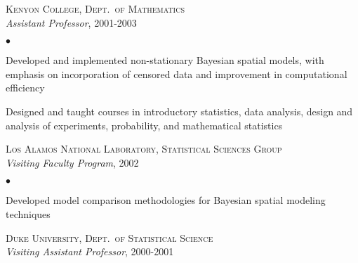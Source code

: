 \documentclass[11pt]{article}
\def\newempl{\vspace*{0.5cm}}
\begin{document}
\newpage
{}



\textsc{Kenyon College, Dept.\ of Mathematics}\\ %
\textit{Assistant Professor}, 2001-2003

\begin{list}{$\bullet$}{
\setlength{\topsep}{0cm}
\setlength{\partopsep}{0cm}
\setlength{\parsep}{0cm}
\setlength{\itemsep}{0cm}
\setlength{\labelsep}{1ex}
\setlength{\labelwidth}{1em}
\setlength{\leftmargin}{1em}
}
\item Developed and implemented non-stationary Bayesian spatial models, with emphasis on incorporation of censored data and improvement in computational efficiency
\item Designed and taught courses in introductory statistics, data analysis,
design and analysis of experiments, probability, and mathematical
statistics
\end{list}



\newempl
\textsc{Los Alamos National Laboratory, Statistical Sciences Group}\\ %
\textit{Visiting Faculty Program}, 2002

\begin{list}{$\bullet$}{
\setlength{\topsep}{0cm}
\setlength{\partopsep}{0cm}
\setlength{\parsep}{0cm}
\setlength{\itemsep}{0cm}
\setlength{\labelsep}{1ex}
\setlength{\labelwidth}{1em}
\setlength{\leftmargin}{1em}
}
\item Developed model comparison methodologies for Bayesian spatial
  modeling techniques
\end{list}




\newempl
\textsc{Duke University, Dept.\ of Statistical Science}\\ %
\textit{Visiting Assistant Professor}, 2000-2001
\end{document}
